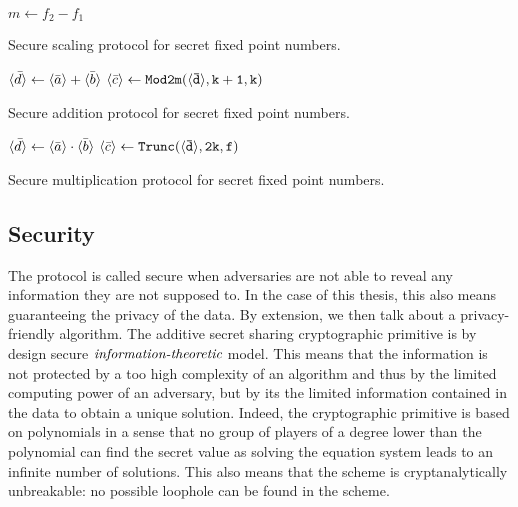 \begin{center}
\begin{algorithm}[H]
\DontPrintSemicolon
$m \leftarrow f_2 - f_1$ \;
\caption{Secure scaling protocol for secret fixed point numbers.}
\label{alg:scale-sfix}
\end{algorithm}
\end{center}

\begin{center}
\begin{algorithm}[H]
\DontPrintSemicolon
$\langle \bar{d} \rangle \leftarrow \langle \bar{a} \rangle + \langle \bar{b} \rangle$ \;
$\langle \bar{c} \rangle \leftarrow \mathtt{Mod2m(\langle \bar{d} \rangle,k+1,k)}$ \;
\caption{Secure addition protocol for secret fixed point numbers.}
\label{alg:sfix-add}
\end{algorithm}
\end{center}

\begin{center}
\begin{algorithm}[H]
\DontPrintSemicolon
$\langle \bar{d} \rangle \leftarrow \langle \bar{a} \rangle \cdot \langle \bar{b} \rangle$ \;
$\langle \bar{c} \rangle \leftarrow \mathtt{Trunc(\langle \bar{d} \rangle,2k,f)}$ \;
\caption{Secure multiplication protocol for secret fixed point numbers.}
\label{alg:sfix-mult}
\end{algorithm}
\end{center}

\subsection{Security}
The protocol is called secure when adversaries are not able to reveal any information they are not supposed to. In the case of this thesis, this also means guaranteeing the privacy of the data. By extension, we then talk about a privacy-friendly algorithm. The additive secret sharing cryptographic primitive is by design secure $\emph{information-theoretic}$ model. This means that the information is not protected by a too high complexity of an algorithm and thus by the limited computing power of an adversary, but by its the limited information contained in the data to obtain a unique solution. Indeed, the cryptographic primitive is based on polynomials in a sense that no group of players of a degree lower than the polynomial can find the secret value as solving the equation system leads to an infinite number of solutions. This also means that the scheme is cryptanalytically unbreakable: no possible loophole can be found in the scheme.

